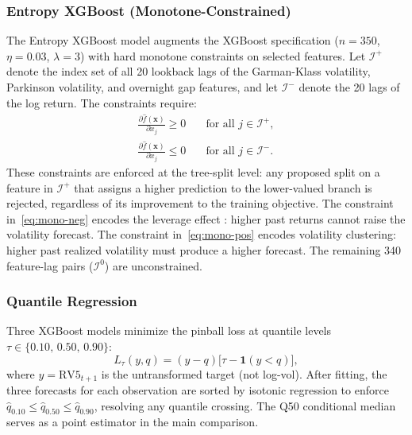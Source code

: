 \documentclass[12pt]{article}
\begin{document}
\subsubsection*{Entropy XGBoost (Monotone-Constrained)}

The Entropy XGBoost model augments the XGBoost specification ($n = 350$,
$\eta = 0.03$, $\lambda = 3$) with hard monotone constraints on selected
features.  Let $\mathcal{I}^{+}$ denote the index set of all 20 lookback
lags of the Garman-Klass volatility, Parkinson volatility, and overnight gap
features, and let $\mathcal{I}^{-}$ denote the 20 lags of the log return.
The constraints require:
\begin{align}
  \frac{\partial \hat{f}(\mathbf{x})}{\partial x_{j}} \geq 0
    & \quad \text{for all } j \in \mathcal{I}^{+},
    \label{eq:mono-pos} \\
  \frac{\partial \hat{f}(\mathbf{x})}{\partial x_{j}} \leq 0
    & \quad \text{for all } j \in \mathcal{I}^{-}.
    \label{eq:mono-neg}
\end{align}
These constraints are enforced at the tree-split level: any proposed split
on a feature in $\mathcal{I}^{+}$ that assigns a higher prediction to the
lower-valued branch is rejected, regardless of its improvement to the
training objective.  The constraint in~\eqref{eq:mono-neg} encodes the
leverage effect \citep{Black1976}: higher past returns cannot raise the
volatility forecast.  The constraint in~\eqref{eq:mono-pos} encodes
volatility clustering: higher past realized volatility must produce a higher
forecast.  The remaining 340 feature-lag pairs ($\mathcal{I}^{0}$) are
unconstrained.

\subsubsection*{Quantile Regression}

Three XGBoost models minimize the pinball loss at quantile levels
$\tau \in \{0.10,\, 0.50,\, 0.90\}$:
\begin{equation}
  L_{\tau}(y, q) = (y - q)\bigl[\tau - \mathbf{1}(y < q)\bigr],
  \label{eq:pinball}
\end{equation}
where $y = \text{RV5}_{t+1}$ is the untransformed target (not log-vol).
After fitting, the three forecasts for each observation are sorted by isotonic
regression to enforce $\hat{q}_{0.10} \leq \hat{q}_{0.50} \leq
\hat{q}_{0.90}$, resolving any quantile crossing.  The Q50 conditional median
serves as a point estimator in the main comparison.
\end{document}
